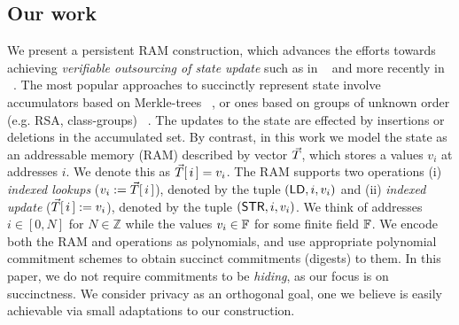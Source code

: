 \documentclass[sigconf]{acmart}
\begin{document}
\subsection{Our work}\label{subsec:ourwork}
We present a persistent RAM construction, which advances the efforts
towards achieving {\em verifiable outsourcing of state update} such as in ~\cite{EPRINT:BFRSBW13}
and more recently in ~\cite{USENIX:OWWB20, CCS:CFHKKO22}. The most popular approaches to succinctly represent
state involve accumulators based on Merkle-trees ~\cite{C:Merkle87}, or ones based on groups of unknown order
(e.g. RSA, class-groups) ~\cite{C:CamLys02,C:BonBunFis19,USENIX:OWWB20, CCS:CFHKKO22}.
The updates to the state are effected by insertions or deletions in the  accumulated set.
By contrast, in this work we
model the state as an addressable memory (RAM) described by vector $\vec{T}$, which stores a values $v_i$ at addresses $i$.
We denote this as $\vec{T}[\,i\,]=v_i$. The RAM supports two operations (i) {\em indexed lookups} ($v_i := \vec{T}[\,i\,]$),
denoted by the tuple $(\mathsf{LD}, i, v_i)$ and (ii) {\em indexed update} ($\vec{T}[\,i\,] := v_i$), denoted
by the tuple $(\mathsf{STR}, i, v_i)$. We think of addresses $i\in [0,N]$ for $N\in \mathbb{Z}$ while the
values $v_i\in \mathbb{F}$ for some finite field $\mathbb{F}$. We encode both the RAM and operations as polynomials, and
use appropriate polynomial commitment schemes to obtain succinct commitments (digests) to them.
In this paper, we do not require commitments to be {\em hiding}, as our focus is on succinctness.
We consider privacy as an orthogonal goal, one we believe is easily achievable via small adaptations to our construction.
\end{document}
